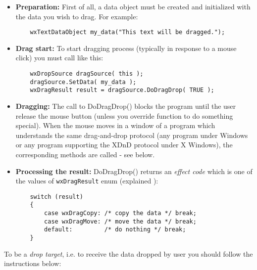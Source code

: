 \begin{itemize}\itemsep=0pt
\item {\bf Preparation:} First of all, a data object must be created and
initialized with the data you wish to drag. For example:

\begin{verbatim}
	wxTextDataObject my_data("This text will be dragged.");
\end{verbatim}
\item{\bf Drag start:} To start dragging process (typically in response to a
mouse click) you must call 
like this:

\begin{verbatim}
	wxDropSource dragSource( this );
	dragSource.SetData( my_data );
	wxDragResult result = dragSource.DoDragDrop( TRUE );
\end{verbatim}
\item {\bf Dragging:} The call to DoDragDrop() blocks the program until the user release the
mouse button (unless you override  function
to do something special). When the mouse moves in a window of a program which understands the
same drag-and-drop protocol (any program under Windows or any program supporting the
XDnD protocol under X Windows), the corresponding  methods
are called - see below.
\item {\bf Processing the result:} DoDragDrop() returns an {\it effect code} which
is one of the values of {\tt wxDragResult} enum (explained ):

\begin{verbatim}
	switch (result)
	{
	    case wxDragCopy: /* copy the data */ break;
	    case wxDragMove: /* move the data */ break;
	    default:         /* do nothing */ break;
	}
\end{verbatim}
\end{itemize}

To be a {\it drop target}, i.e. to receive the data dropped by user you should
follow the instructions below:

